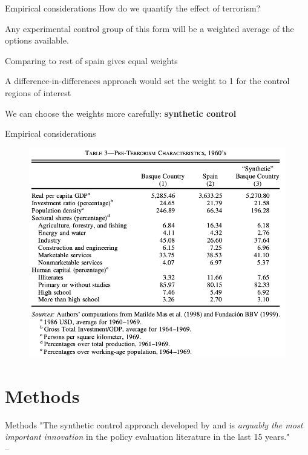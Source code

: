 \documentclass[notes,11pt, aspectratio=169]{beamer}
\newenvironment{wideitemize}{\itemize\addtolength{\itemsep}{10pt}}{\enditemize}
\begin{document}
\begin{frame}{Empirical considerations}
    How do we quantify the effect of terrorism? \\
    \bigskip 
    
     \pause 

    \bigskip \bigskip 
    
    Any experimental control group of this form will be a weighted average of the options available. \medskip
        \begin{wideitemize}
           \item Comparing to rest of spain gives equal weights 
           \item A difference-in-differences approach would set the weight to 1 for the control regions of interest
           \item We can choose the weights more carefully: \textbf{synthetic control}
        \end{wideitemize}
    
\end{frame}

\begin{frame}{Empirical considerations}
    \begin{figure}
        \centering
        \includegraphics[width = .6\textwidth]{figures/balance panel all.png}
        \label{fig:balance_all-2}
    \end{figure}
\end{frame}

\section{Methods}

\begin{frame}{Methods}
\center "The synthetic control approach developed by \cite{abadie_synthetic_2010} and \cite{abadie_economic_2003} is \textit{arguably the most important innovation} in the policy evaluation literature in the last 15 years." 
	\\ \medskip \medskip \medskip \hspace*{\fill} --\cite{athey_state_2017}
\end{frame}
\end{document}
